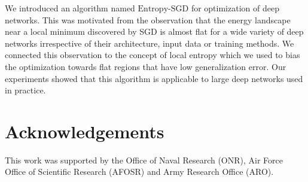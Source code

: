 \documentclass[10pt]{article}
\newcommand{\entropysgd}{\mathrm{Entropy}\textrm{-}\mathrm{SGD}}
\begin{document}
We introduced an algorithm named $\entropysgd$ for optimization of deep networks. This was motivated from the observation that the energy landscape near a local minimum discovered by SGD is almost flat for a wide variety of deep networks irrespective of their architecture, input data or training methods. We connected this observation to the concept of local entropy which we used to bias the optimization towards flat regions that have low generalization error. Our experiments showed that this algorithm is applicable to large deep networks used in practice.

\section{Acknowledgements}
\label{s:acknowledgements}

This work was supported by the Office of Naval Research (ONR), Air Force Office of Scientific Research (AFOSR) and Army Research Office (ARO).

{
\footnotesize
\linespread{1.0}


}
\end{document}
